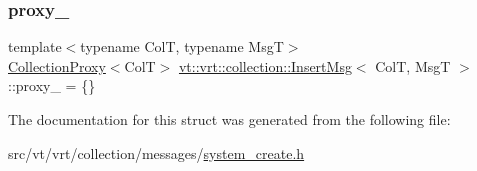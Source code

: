 \mbox{\label{structvt_1_1vrt_1_1collection_1_1_insert_msg_aafebebf63eb0e3b61f1b800a9663065e}} 
\subsubsection{\texorpdfstring{proxy\+\_\+}{proxy\_}}
{\footnotesize\ttfamily template$<$typename ColT, typename MsgT$>$ \\
\hyperlink{structvt_1_1vrt_1_1collection_1_1_collection_proxy}{Collection\+Proxy}$<$ColT$>$ \hyperlink{structvt_1_1vrt_1_1collection_1_1_insert_msg}{vt\+::vrt\+::collection\+::\+Insert\+Msg}$<$ ColT, MsgT $>$\+::proxy\+\_\+ = \{\}}



The documentation for this struct was generated from the following file\+:\begin{DoxyCompactItemize}
\item 
src/vt/vrt/collection/messages/\hyperlink{system__create_8h}{system\+\_\+create.\+h}\end{DoxyCompactItemize}
